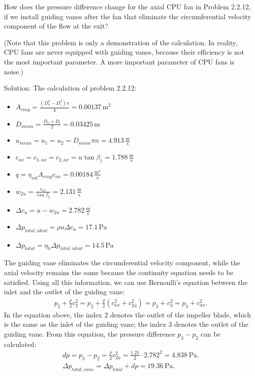 \vspace{1cm}
\begin{tcolorbox}

How does the pressure difference change for the axial CPU fan in Problem 2.2.12, if we install guiding vanes after the fan that eliminate the circumferential velocity component of the flow at the exit? 

(Note that this problem is only a demonstration of the calculation. In reality, CPU fans are never equipped with guiding vanes, because their efficiency is not the most important parameter. A more important parameter of CPU fans is noise.)

Solution:
The calculation of problem 2.2.12:
\begin{itemize}
\item $A_{ring}=\frac{\left(D_o^2-D_i^2\right)\pi}{4}=0.00137\,\mathrm{m^2}$
\item $D_{mean}=\frac{D_o+D_i}{2}=0.03425\,\mathrm{m}$
\item $u_{mean}=u_1=u_2=D_{mean}\pi n=4.913\,\mathrm{\frac{m}{s}}$
\item $c_{ax}=c_{1,ax}=c_{2,ax}=u \tan\beta_1=1.788\,\mathrm{\frac{m}{s}}$
\item $q=\eta_{vol}A_{ring}c_{ax}=0.00184\,\mathrm{\frac{m^3}{s}}$
\item $w_{2u}=\frac{c_{ax}}{\tan\beta_2}=2.131\,\mathrm{\frac{m}{s}}$
\item $\Delta c_u=u-w_{2u}=2.782\,\mathrm{\frac{m}{s}}$
\item $\Delta p_{total,ideal}=\rho u\Delta c_u=17.1\,\mathrm{Pa}$
\item $\Delta p_{total}=\eta_h \Delta p_{total,ideal}=14.5\,\mathrm{Pa}$
\end{itemize}

The guiding vane eliminates the circumferential velocity component, while the axial velocity remains the same because the continuity equation needs to be satisfied. Using all this information, we can use Bernoulli's equation between the inlet and the outlet of the guiding vane:
\begin{align*}
& p_2 + \frac{\rho}{2}c_2^2 = p_2 + \frac{\rho}{2} (c_{ax}^2 + c_{2u}^2) = p_3 + c_3^2 = p_3 + c_{ax}^2. 
\end{align*} 
In the equation above, the index 2 denotes the outlet of the impeller blade, which is the same as the inlet of the guiding vane; the index 3 denotes the outlet of the guiding vane. From this equation, the pressure difference $p_3 - p_2$ can be calculated:
\begin{align*}
& dp = p_3 - p_2 = \frac{\rho}{2}c_{2u}^2 = \frac{1.25}{2}\cdot 2.782^2 = 4.838~\mathrm{Pa}. \\
& \Delta p_{total,vane} = \Delta p_{total} + dp = 19.36~\mathrm{Pa}.
\end{align*}
\end{tcolorbox}


